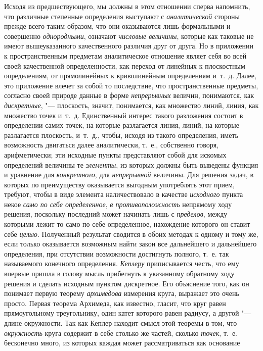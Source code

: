 Исходя из предшествующего, мы должны в этом отношении сперва напомнить, что
различные степенные определения выступают с
{\em аналитической} стороны прежде всего таким образом,
что они оказываются лишь формальными и совершенно
{\em однородными}, означают
{\em числовые величины}, которые как таковые не имеют
вышеуказанного качественного различия друг от друга. Но в приложении к
пространственным предметам аналитическое отношение являет себя во всей
своей качественной определенности, как переход от линейных к плоскостным
определениям, от прямолинейных к криволинейным определениям и~т.~д. Далее,
это приложение влечет за собой то последствие, что пространственные
предметы, согласно своей природе данные в форме
{\em непрерывных} величин, понимаются, как
{\em дискретные}, "--- плоскость, значит, понимается, как
множество линий, линия, как множество точек и~т.~д. Единственный интерес
такого разложения состоит в определении самих точек, на которые разлагается
линия, линий, на которые разлагается плоскость, и~т.~д., чтобы, исходя из
такого определения, иметь возможность двигаться далее аналитически, т.~е.,
собственно говоря, арифметически; эти исходные пункты представляют собой
для искомых определений величины те {\em элементы}, из
которых должны быть выведены функция и уравнение для
{\em конкретного}, для
{\em непрерывной} величины. Для решения задач, в
которых по преимуществу оказывается выгодным употреблять этот прием,
требуют, чтобы в виде элемента наличествовало в качестве
{\em исходного} пункта некое
{\em само по себе определенное},
{\em в противоположность} непрямому ходу решения,
поскольку последний может начинать лишь с
{\em пределов}, между которыми лежит то само по себе
определенное, нахождение которого он ставит себе
{\em целью}. Полученный результат сводится в обоих
методах к одному и тому же, если только оказывается возможным найти закон
все дальнейшего и дальнейшего определения, при отсутствии возможности
достигнуть полного, т.~е. так называемого конечного определения.
{\em Кеплеру} приписывается честь, что ему впервые
пришла в голову мысль прибегнуть к указанному обратному ходу решения и
сделать исходным пунктом дискретное. Его объяснение того, как он понимает
первую теорему {\em архимедова} измерения круга,
выражает это очень просто. Первая теорема Архимеда, как известно, гласит,
что круг равен прямоугольному треугольнику, один катет которого равен
радиусу, а другой "--- длине окружности. Так как Кеплер находит смысл этой
теоремы в том, что {\em окружность} круга содержит в
себе столько же частей, сколько {\em точек}, т.~е.
бесконечно много, из которых каждая может рассматриваться как основание
